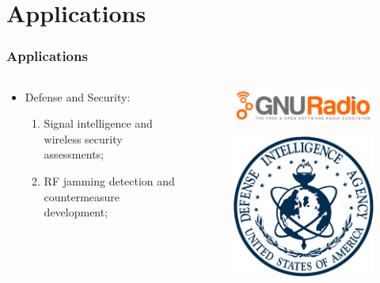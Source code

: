 \section{Applications}
\begin{frame}
	\frametitle{Applications}
    
\begin{columns}
        \begin{column}{0.5\textwidth}
     \begin{itemize}
    \item Defense and Security:
    \begin{enumerate}
    \item Signal intelligence and wireless security assessments;
    \item RF jamming detection and countermeasure development;
    \end{enumerate}
     \end{itemize}
     
        \end{column}
        
        \begin{column}{0.5\textwidth}
            \begin{figure}[]
                \centering
                \includegraphics[width=\linewidth]{img/GNU_radio_logo.png}
                \label{fig:gnu_radio_logo}
            \end{figure}
            \begin{figure}
                \centering
                \includegraphics[width=0.5\linewidth]{img/applications/intelligence.png}
                \label{fig:enter-label}
            \end{figure}
        \end{column}
    \end{columns}
\end{frame}

